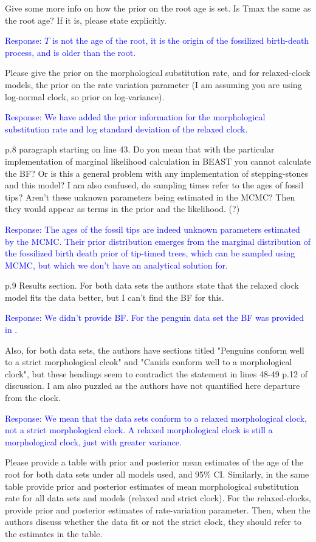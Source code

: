 \documentclass[11pt]{article}
\newcommand{\response}[1]{\medskip{}\textcolor{blue}{{Response: #1}}\medskip{}}
\begin{document}
Give some more info on how the prior on the root age is set. Is Tmax the same as the root age? If it is, please state explicitly.

\response{$T$ is not the age of the root, it is the origin of the fossilized birth-death process, and is older than the root.}

Please give the prior on the morphological substitution rate, and for relaxed-clock models, the prior on the rate variation parameter (I am assuming you are using log-normal clock, so prior on log-variance).

\response{We have added the prior information for the morphological substitution rate and log standard deviation of the relaxed clock.}

p.8 paragraph starting on line 43. Do you mean that with the particular implementation of marginal likelihood calculation in BEAST you cannot calculate the BF? Or is this a general problem with any implementation of stepping-stones and this model? I am also confused, do sampling times refer to the ages of fossil tips? Aren't these unknown parameters being estimated in the MCMC? Then they would appear as terms in the prior and the likelihood. (?)

\response{The ages of the fossil tips are indeed unknown parameters estimated by the MCMC. Their prior distribution emerges from the marginal distribution of the fossilized birth death prior of tip-timed trees, which can be sampled using MCMC, but which we don't have an analytical solution for.}

p.9 Results section. For both data sets the authors state that the relaxed clock model fits the data better, but I can't find the BF for this. 

\response{We didn't provide BF. For the penguin data set the BF was provided in \cite{gavryushkina2015bayesian}.}

Also, for both data sets, the authors have sections titled "Penguins conform well to a strict morphological clcok" and "Canids conform well to a morphological clock", but these headings seem to contradict the statement in lines 48-49 p.12 of discussion. I am also puzzled as the authors have not quantified here departure from the clock. 

\response{We mean that the data sets conform to a relaxed morphological clock, not a strict morphological clock. A relaxed morphological clock is still a morphological clock, just with greater variance.}

Please provide a table with prior and posterior mean estimates of the age of the root for both data sets under all models used, and 95\% CI. Similarly, in the same table provide prior and posterior estimates of mean morphological substitution rate for all data sets and models (relaxed and strict clock). For the relaxed-clocks, provide prior and posterior estimates of rate-variation parameter. Then, when the authors discuss whether the data fit or not the strict clock, they should refer to the estimates in the table.
\end{document}
